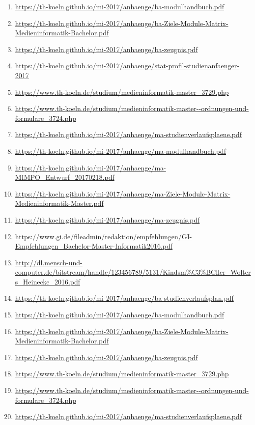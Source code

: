 \documentclass[BCOR12mm,DIV11,titlepage,a4paper,oneside,10pt]{scrbook}
\begin{document}
\begin{sloppypar}
\begin{flushleft}
\begin{enumerate}
\item{\url{https://th-koeln.github.io/mi-2017/anhaenge/ba-modulhandbuch.pdf}} 
\item{\url{https://th-koeln.github.io/mi-2017/anhaenge/ba-Ziele-Module-Matrix-Medieninformatik-Bachelor.pdf}} 
\item{\url{https://th-koeln.github.io/mi-2017/anhaenge/ba-zeugnis.pdf}} 
\item{\url{https://th-koeln.github.io/mi-2017/anhaenge/stat-profil-studienanfaenger-2017}} 
\item{\url{https://www.th-koeln.de/studium/medieninformatik-master\_3729.php}} 
\item{\url{https://www.th-koeln.de/studium/medieninformatik-master--ordnungen-und-formulare\_3724.php}} 
\item{\url{https://th-koeln.github.io/mi-2017/anhaenge/ma-studienverlaufsplaene.pdf}} 
\item{\url{https://th-koeln.github.io/mi-2017/anhaenge/ma-modulhandbuch.pdf}} 
\item{\url{https://th-koeln.github.io/mi-2017/anhaenge/ma-MIMPO\_Entwurf\_20170218.pdf}} 
\item{\url{https://th-koeln.github.io/mi-2017/anhaenge/ma-Ziele-Module-Matrix-Medieninformatik-Master.pdf}} 
\item{\url{https://th-koeln.github.io/mi-2017/anhaenge/ma-zeugnis.pdf}} 
\item{\url{https://www.gi.de/fileadmin/redaktion/empfehlungen/GI-Empfehlungen\_Bachelor-Master-Informatik2016.pdf}} 
\item{\url{http://dl.mensch-und-computer.de/bitstream/handle/123456789/5131/Kindsm\%C3\%BCller\_Wolters\_Heinecke\_2016.pdf}} 
\item{\url{https://th-koeln.github.io/mi-2017/anhaenge/ba-studienverlaufsplan.pdf}} 
\item{\url{https://th-koeln.github.io/mi-2017/anhaenge/ba-modulhandbuch.pdf}} 
\item{\url{https://th-koeln.github.io/mi-2017/anhaenge/ba-Ziele-Module-Matrix-Medieninformatik-Bachelor.pdf}} 
\item{\url{https://th-koeln.github.io/mi-2017/anhaenge/ba-zeugnis.pdf}} 
\item{\url{https://www.th-koeln.de/studium/medieninformatik-master\_3729.php}} 
\item{\url{https://www.th-koeln.de/studium/medieninformatik-master--ordnungen-und-formulare\_3724.php}} 
\item{\url{https://th-koeln.github.io/mi-2017/anhaenge/ma-studienverlaufsplaene.pdf}} 

\end{enumerate}
\end{flushleft}
\end{sloppypar}
\end{document}
